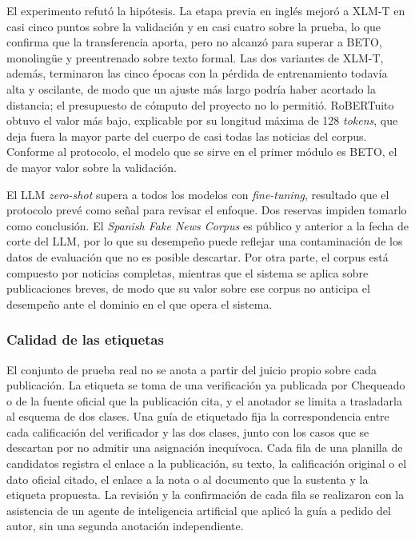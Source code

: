 El experimento refutó la hipótesis. La etapa previa en inglés mejoró a XLM-T en casi cinco puntos sobre la validación y en casi cuatro sobre la prueba, lo que confirma que la transferencia aporta, pero no alcanzó para superar a BETO, monolingüe y preentrenado sobre texto formal. Las dos variantes de XLM-T, además, terminaron las cinco épocas con la pérdida de entrenamiento todavía alta y oscilante, de modo que un ajuste más largo podría haber acortado la distancia; el presupuesto de cómputo del proyecto no lo permitió. RoBERTuito obtuvo el valor más bajo, explicable por su longitud máxima de 128 \textit{tokens}, que deja fuera la mayor parte del cuerpo de casi todas las noticias del corpus. Conforme al protocolo, el modelo que se sirve en el primer módulo es BETO, el de mayor valor sobre la validación.

El LLM \textit{zero-shot} supera a todos los modelos con \textit{fine-tuning}, resultado que el protocolo prevé como señal para revisar el enfoque. Dos reservas impiden tomarlo como conclusión. El \textit{Spanish Fake News Corpus} es público y anterior a la fecha de corte del LLM, por lo que su desempeño puede reflejar una contaminación de los datos de evaluación que no es posible descartar. Por otra parte, el corpus está compuesto por noticias completas, mientras que el sistema se aplica sobre publicaciones breves, de modo que su valor sobre ese corpus no anticipa el desempeño ante el dominio en el que opera el sistema.

\subsubsection{Calidad de las etiquetas}

El conjunto de prueba real no se anota a partir del juicio propio sobre cada publicación. La etiqueta se toma de una verificación ya publicada por Chequeado o de la fuente oficial que la publicación cita, y el anotador se limita a trasladarla al esquema de dos clases. Una guía de etiquetado fija la correspondencia entre cada calificación del verificador y las dos clases, junto con los casos que se descartan por no admitir una asignación inequívoca. Cada fila de una planilla de candidatos registra el enlace a la publicación, su texto, la calificación original o el dato oficial citado, el enlace a la nota o al documento que la sustenta y la etiqueta propuesta. La revisión y la confirmación de cada fila se realizaron con la asistencia de un agente de inteligencia artificial que aplicó la guía a pedido del autor, sin una segunda anotación independiente.

